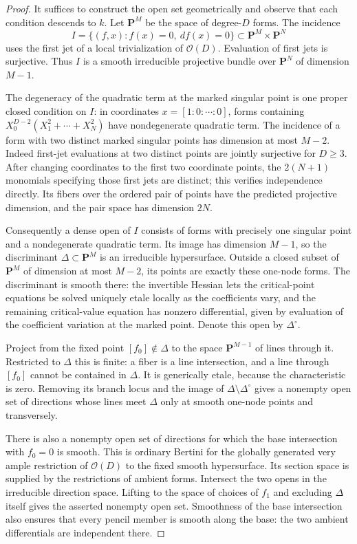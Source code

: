 \begin{proof}
It suffices to construct the open set geometrically and observe
that each condition descends to $k$. Let $\mathbf P^M$ be the
space of degree-$D$ forms. The incidence
\[
 I=\{(f,x): f(x)=0,\ d f(x)=0\}
                      \subset\mathbf P^M\times\mathbf P^N
\]
uses the first jet of a local trivialization of $\mathcal O(D)$.
Evaluation of first jets is surjective. Thus $I$ is a smooth
irreducible projective bundle over $\mathbf P^N$ of dimension
$M-1$.

The degeneracy of the quadratic term at the marked singular
point is one proper closed condition on $I$: in coordinates
$x=[1:0:\cdots:0]$, forms containing
$X_0^{D-2}(X_1^2+\cdots+X_N^2)$ have nondegenerate quadratic
term. The incidence of a form with two distinct marked singular
points has dimension at most $M-2$. Indeed first-jet evaluations
at two distinct points are jointly surjective for $D\ge3$.
After changing coordinates to the first two coordinate points,
the $2(N+1)$ monomials specifying those first jets are distinct;
this verifies independence directly. Its fibers over the ordered
pair of points have the predicted projective dimension, and the
pair space has dimension $2N$.

Consequently a dense open of $I$ consists of forms with precisely
one singular point and a nondegenerate quadratic term. Its image
has dimension $M-1$, so the discriminant $\Delta\subset\mathbf P^M$
is an irreducible hypersurface. Outside a closed subset of
$\mathbf P^M$ of dimension at most $M-2$, its points are exactly
these one-node forms. The discriminant is smooth there: the
invertible Hessian lets the critical-point equations be solved
uniquely etale locally as the coefficients vary, and the remaining
critical-value equation has nonzero differential, given by
evaluation of the coefficient variation at the marked point.
Denote this open by $\Delta^\circ$.

Project from the fixed point $[f_0]\notin\Delta$ to the space
$\mathbf P^{M-1}$ of lines through it. Restricted to $\Delta$
this is finite: a fiber is a line intersection, and a line through
$[f_0]$ cannot be contained in $\Delta$. It is generically etale,
because the characteristic is zero. Removing its branch locus
and the image of $\Delta\setminus\Delta^\circ$ gives a nonempty
open set of directions whose lines meet $\Delta$ only at smooth
one-node points and transversely.

There is also a nonempty open set of directions for which the
base intersection with $f_0=0$ is smooth. This is ordinary Bertini
for the globally generated very ample restriction of
$\mathcal O(D)$ to the fixed smooth hypersurface. Its section
space is supplied by the restrictions of ambient forms. Intersect
the two opens in the irreducible direction space. Lifting to the
space of choices of $f_1$ and excluding $\Delta$ itself gives the
asserted nonempty open set. Smoothness of the base intersection
also ensures that every pencil member is smooth along the base:
the two ambient differentials are independent there.
\end{proof}

